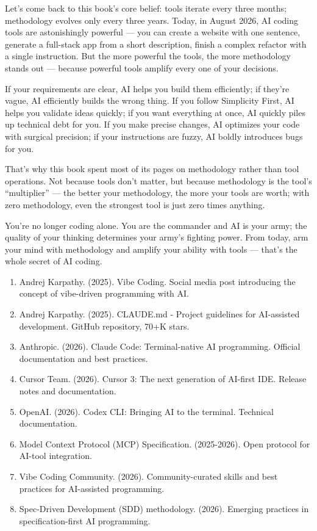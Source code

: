 
Let's come back to this book's core belief: tools iterate every three months; methodology evolves only every three years. Today, in August 2026, AI coding tools are astonishingly powerful — you can create a website with one sentence, generate a full-stack app from a short description, finish a complex refactor with a single instruction. But the more powerful the tools, the more methodology stands out — because powerful tools amplify every one of your decisions.

If your requirements are clear, AI helps you build them efficiently; if they're vague, AI efficiently builds the wrong thing. If you follow Simplicity First, AI helps you validate ideas quickly; if you want everything at once, AI quickly piles up technical debt for you. If you make precise changes, AI optimizes your code with surgical precision; if your instructions are fuzzy, AI boldly introduces bugs for you.

That's why this book spent most of its pages on methodology rather than tool operations. Not because tools don't matter, but because methodology is the tool's “multiplier” — the better your methodology, the more your tools are worth; with zero methodology, even the strongest tool is just zero times anything.

You're no longer coding alone. You are the commander and AI is your army; the quality of your thinking determines your army's fighting power. From today, arm your mind with methodology and amplify your ability with tools — that's the whole secret of AI coding.


\begin{enumerate}
  \item Andrej Karpathy. (2025). Vibe Coding. Social media post introducing the concept of vibe-driven programming with AI.
  \item Andrej Karpathy. (2025). CLAUDE.md - Project guidelines for AI-assisted development. GitHub repository, 70+K stars.
  \item Anthropic. (2026). Claude Code: Terminal-native AI programming. Official documentation and best practices.
  \item Cursor Team. (2026). Cursor 3: The next generation of AI-first IDE. Release notes and documentation.
  \item OpenAI. (2026). Codex CLI: Bringing AI to the terminal. Technical documentation.
  \item Model Context Protocol (MCP) Specification. (2025-2026). Open protocol for AI-tool integration.
  \item Vibe Coding Community. (2026). Community-curated skills and best practices for AI-assisted programming.
  \item Spec-Driven Development (SDD) methodology. (2026). Emerging practices in specification-first AI programming.
\end{enumerate}
